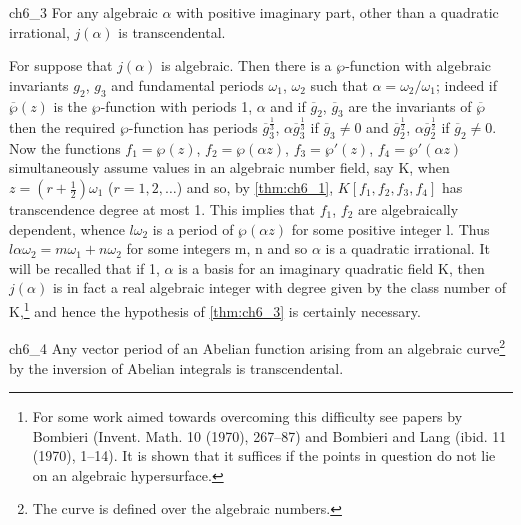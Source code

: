 \begin{mythm}{}{ch6_3}
For any algebraic $\alpha$ with positive imaginary part, other than a quadratic irrational, $j(\alpha)$ is transcendental.
\end{mythm}

For suppose that $j(\alpha)$ is algebraic. Then there is a $\wp$-function with algebraic invariants $g_2$, $g_3$ and fundamental periods $\omega_1$, $\omega_2$ such that $\alpha = \omega_2/\omega_1$; indeed if $\overline{\wp}(z)$ is the $\wp$-function with periods 1, $\alpha$ and if $\overline{g}_2$, $\overline{g}_3$ are the invariants of $\overline{\wp}$ then the required $\wp$-function has periods $\overline{g}_3^{\frac{1}{3}}$, $\alpha \overline{g}_3^{\frac{1}{3}}$ if $\overline{g}_3 \neq 0$ and $\overline{g}_2^{\frac{1}{2}}$, $\alpha \overline{g}_2^{\frac{1}{2}}$ if $\overline{g}_2 \neq 0$. Now the functions $f_1 = \wp(z)$, $f_2 = \wp(\alpha z)$, $f_3 = \wp'(z)$, $f_4 = \wp'(\alpha z)$ simultaneously assume values in an algebraic number field, say K, when $z = (r + \frac{1}{2})\omega_1$ ($r = 1, 2, \ldots$) and so, by \autoref{thm:ch6_1}, $K[f_1, f_2, f_3, f_4]$ has transcendence degree at most 1. This implies that $f_1$, $f_2$ are algebraically dependent, whence $l\omega_2$ is a period of $\wp(\alpha z)$ for some positive integer l. Thus $l\alpha \omega_2 = m\omega_1 + n\omega_2$ for some integers m, n and so $\alpha$ is a quadratic irrational. It will be recalled that if 1, $\alpha$ is a basis for an imaginary quadratic field K, then $j(\alpha)$ is in fact a real algebraic integer with degree given by the class number of K,\footnote{For some work aimed towards overcoming this difficulty see papers by Bombieri (Invent. Math. 10 (1970), 267--87) and Bombieri and Lang (ibid. 11 (1970), 1--14). It is shown that it suffices if the points in question do not lie on an algebraic hypersurface.} and hence the hypothesis of \autoref{thm:ch6_3} is certainly necessary.

\begin{mythm}{}{ch6_4}
Any vector period of an Abelian function arising from an algebraic curve\footnote{The curve is defined over the algebraic numbers.} by the inversion of Abelian integrals is transcendental.
\end{mythm}

